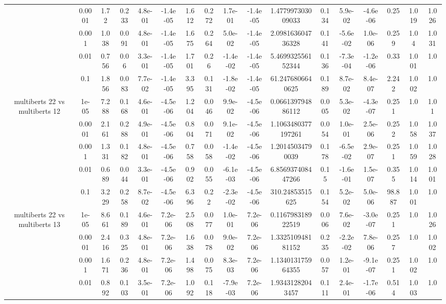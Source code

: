 \begin{tabular}{|c|c|c|c|c|c|c|c|c|c|c|c|c|c|c|c|c|}
 & 0.0001 & 1.72 & 0.233 & 4.8e-01 & -1.4e-05 & 1.612 & 0.272 & 1.7e-01 & -1.4e-05 & 1.477997303009033 & 0.134 & 5.9e-02 & -4.6e-06 & 0.25 & 1.019 & 1.026 \\
 & 0.001 & 1.038 & 0.091 & 4.8e-01 & -1.4e-05 & 1.675 & 0.264 & 5.0e-02 & -1.4e-05 & 2.098163604736328 & 0.141 & -5.6e-02 & 1.0e-06 & 0.259 & 1.04 & 1.031 \\
 & 0.01 & 0.756 & 0.06 & 3.3e-01 & -1.4e-05 & 1.701 & 0.26 & -1.4e-02 & -1.4e-05 & 5.469932556152344 & 0.136 & -7.3e-04 & -1.2e-06 & 0.33 & 1.001 & 1.0 \\
 & 0.1 & 1.856 & 0.083 & 7.7e-02 & -1.4e-05 & 3.395 & 0.131 & -1.8e-02 & -1.4e-05 & 61.2476806640625 & 0.189 & 8.7e-02 & 8.4e-07 & 2.242 & 1.002 & 1.0 \\
\hline
\multirow{5}{*}{multiberts 22 vs multiberts 12} & 1e-05 & 7.288 & 0.168 & 4.6e-01 & -4.5e-06 & 1.204 & 0.046 & 9.9e-02 & -4.5e-06 & 0.066139794886112 & 0.005 & 5.3e-02 & -4.3e-07 & 0.251 & 1.0 & 1.01 \\
 & 0.0001 & 2.161 & 0.288 & 4.9e-01 & -4.5e-06 & 0.804 & 0.071 & 9.1e-02 & -4.5e-06 & 1.1063480377197261 & 0.054 & 1.0e-01 & 2.5e-06 & 0.252 & 1.058 & 1.037 \\
 & 0.001 & 1.331 & 0.182 & 4.8e-01 & -4.5e-06 & 0.758 & 0.058 & -1.4e-02 & -4.5e-06 & 1.20145034790039 & 0.178 & -6.5e-02 & 2.9e-07 & 0.251 & 1.059 & 1.028 \\
 & 0.01 & 0.689 & 0.044 & 3.3e-01 & -4.5e-06 & 0.902 & 0.055 & -6.1e-03 & -4.5e-06 & 6.856937408447266 & 0.15 & -1.6e-01 & 1.5e-07 & 0.355 & 1.014 & 1.001 \\
 & 0.1 & 3.229 & 0.258 & 8.7e-02 & -4.5e-06 & 6.396 & 0.22 & -2.3e-02 & -4.5e-06 & 310.24853515625 & 0.154 & 5.2e-02 & 5.0e-06 & 98.887 & 1.001 & 1.0 \\
\hline
\multirow{5}{*}{multiberts 22 vs multiberts 13} & 1e-05 & 8.661 & 0.189 & 4.6e-01 & 7.2e-06 & 2.508 & 0.077 & 1.0e-01 & 7.2e-06 & 0.116798318922519 & 0.006 & 7.6e-02 & -3.0e-07 & 0.251 & 1.0 & 1.026 \\
 & 0.0001 & 2.416 & 0.325 & 4.8e-01 & 7.2e-06 & 1.638 & 0.078 & 9.0e-02 & 7.2e-06 & 1.332510948181152 & 0.235 & -2.2e-02 & 7.8e-06 & 0.257 & 1.0 & 1.002 \\
 & 0.001 & 1.671 & 0.236 & 4.8e-01 & 7.2e-06 & 1.498 & 0.075 & 8.3e-03 & 7.2e-06 & 1.134013175964355 & 0.057 & 1.2e-01 & -9.1e-07 & 0.251 & 1.002 & 1.0 \\
 & 0.01 & 0.892 & 0.103 & 3.5e-01 & 7.2e-06 & 1.092 & 0.118 & -7.9e-03 & 7.2e-06 & 1.93431282043457 & 0.111 & 2.4e-01 & -1.7e-06 & 0.514 & 1.003 & 1.0 \\

\end{tabular}
